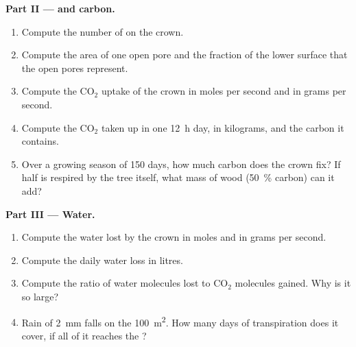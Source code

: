\begin{problem}
\medskip
\noindent\textbf{Part II ---  and carbon.}
\begin{enumerate}[resume]
  \item Compute the number of  on the crown.
  \item Compute the area of one open pore and the fraction of the
        lower  surface that the open pores represent.
  \item Compute the $\mathrm{CO_2}$ uptake of the crown in moles per
        second and in grams per second.
  \item Compute the $\mathrm{CO_2}$ taken up in one \qty{12}{h} day, in
        kilograms, and the carbon it contains.
  \item Over a growing season of \qty{150}{} days, how much carbon
        does the crown fix? If half is respired by the tree itself,
        what mass of wood (\qty{50}{\%} carbon) can it add?
\end{enumerate}

\medskip
\noindent\textbf{Part III --- Water.}
\begin{enumerate}[resume]
  \item Compute the water lost by the crown in moles and in grams per
        second.
  \item Compute the daily water loss in litres.
  \item Compute the ratio of water molecules lost to $\mathrm{CO_2}$
        molecules gained. Why is it so large?
  \item Rain of \qty{2}{mm} falls on the \qty{100}{m^2}. How many
        days of transpiration does it cover, if all of it reaches the
        ?
\end{enumerate}


\end{problem}
